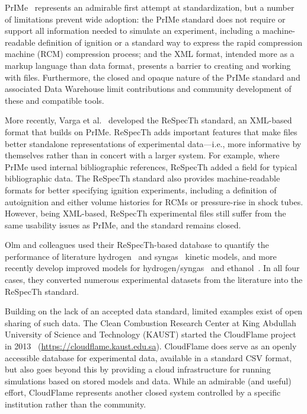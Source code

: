 \documentclass[12pt]{ussci}
\begin{document}
PrIMe~\autocite{Frenklach:2007bm,You:2011hy} represents an admirable  first attempt at standardization, but a number of limitations
prevent wide adoption: the PrIMe standard does not require or support all information
needed to simulate an experiment, including a machine-readable definition of ignition or a
standard way to express the rapid compression machine (RCM) compression process; and
the XML format, intended more as a markup language than data format, presents a barrier
to creating and working with files.
Furthermore, the closed and opaque nature of the PrIMe standard and associated Data Warehouse
limit contributions and community development of these and compatible tools.

More recently, Varga et al.~\autocite{Varga2015a,Varga2015b} developed the ReSpecTh standard,
an XML-based format that builds on PrIMe. ReSpecTh adds important features that make files
better standalone representations of experimental data---i.e., more informative by themselves
rather than in concert with a larger system.
For example, where PrIMe used internal bibliographic references, ReSpecTh added a field for
typical bibliographic data. The ReSpecTh standard also provides machine-readable formats
for better specifying ignition experiments, including a definition of autoignition and
either volume histories for RCMs or pressure-rise in shock tubes.
However, being XML-based, ReSpecTh experimental files still suffer from the same usability
issues as PrIMe, and the standard remains closed.

Olm and colleagues used their ReSpecTh-based database to quantify the performance of literature
hydrogen~\autocite{Olm:2014gn} and syngas~\autocite{Olm:2015ch} kinetic models, and more recently
develop improved models for hydrogen\slash syngas~\autocite{Varga:2016gj} and
ethanol~\autocite{Olm:2016et}. In all four cases, they converted numerous experimental datasets
from the literature into the ReSpecTh standard.

Building on the lack of an accepted data standard, limited examples exist of open sharing
of such data. The Clean Combustion Research Center at King Abdullah University of Science
and Technology (KAUST) started the CloudFlame project in 2013~\autocite{Goteng:2013cf}
(\url{https://cloudflame.kaust.edu.sa}). CloudFlame does serve as an openly accessible database
for experimental data, available in a standard CSV format, but also goes beyond this by
providing a cloud infrastructure for running simulations based on stored models and data.
While an admirable (and useful) effort, CloudFlame represents another closed system controlled
by a specific institution rather than the community.
\end{document}
